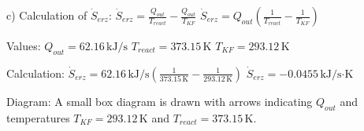 c) Calculation of \( \dot{S}_{erz} \):  
\( \dot{S}_{erz} = \frac{Q_{out}}{T_{react}} - \frac{Q_{out}}{T_{KF}} \)  
\( \dot{S}_{erz} = Q_{out} \left( \frac{1}{T_{react}} - \frac{1}{T_{KF}} \right) \)  

Values:  
\( Q_{out} = 62.16 \, \text{kJ/s} \)  
\( T_{react} = 373.15 \, \text{K} \)  
\( T_{KF} = 293.12 \, \text{K} \)  

Calculation:  
\( \dot{S}_{erz} = 62.16 \, \text{kJ/s} \left( \frac{1}{373.15 \, \text{K}} - \frac{1}{293.12 \, \text{K}} \right) \)  
\( \dot{S}_{erz} = -0.0455 \, \text{kJ/s·K} \)  

Diagram:  
A small box diagram is drawn with arrows indicating \( Q_{out} \) and temperatures \( T_{KF} = 293.12 \, \text{K} \) and \( T_{react} = 373.15 \, \text{K} \).